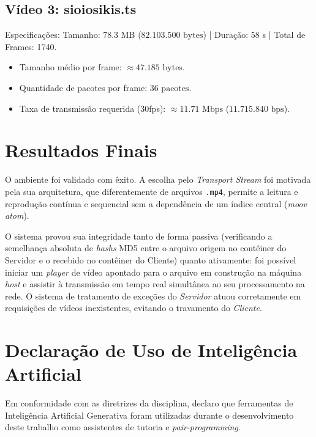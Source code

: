 \documentclass[12pt]{article}
\begin{document}
\subsection{Vídeo 3: sioiosikis.ts}
{Especificações:} Tamanho: 78.3 MB ($82.103.500\text{ bytes}$) | Duração: 58 s | Total de Frames: 1740.
\begin{itemize}
    \item {Tamanho médio por frame:} $\approx 47.185\text{ bytes}$.
    \item {Quantidade de pacotes por frame:} $36\text{ pacotes}$.
    \item {Taxa de transmissão requerida (30fps):} $\approx 11.71\text{ Mbps}$ ($11.715.840\text{ bps}$).
\end{itemize}

\section{Resultados Finais}
O ambiente foi validado com êxito. A escolha pelo \textit{Transport Stream} foi motivada pela sua arquitetura, que diferentemente de arquivos \texttt{.mp4}, permite a leitura e reprodução contínua e sequencial sem a dependência de um índice central (\textit{moov atom}).

O sistema provou sua integridade tanto de forma passiva (verificando a semelhança absoluta de \textit{hashs} MD5 entre o arquivo origem no contêiner do Servidor e o recebido no contêiner do Cliente) quanto ativamente: foi possível iniciar um \textit{player} de vídeo apontado para o arquivo em construção na máquina \textit{host} e assistir à transmissão em tempo real simultânea ao seu processamento na rede. O sistema de tratamento de exceções do \textit{Servidor} atuou corretamente em requisições de vídeos inexistentes, evitando o travamento do \textit{Cliente}.

\section{Declaração de Uso de Inteligência Artificial}
Em conformidade com as diretrizes da disciplina, declaro que ferramentas de Inteligência Artificial Generativa foram utilizadas durante o desenvolvimento deste trabalho como assistentes de tutoria e \textit{pair-programming}.
\end{document}
